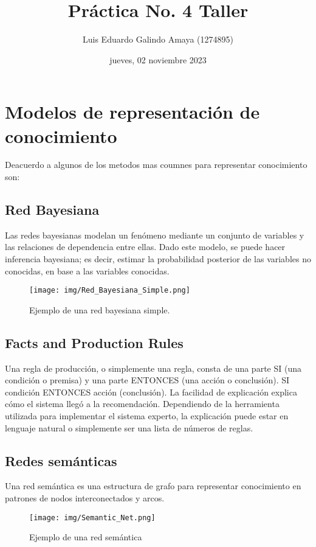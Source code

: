 \documentclass[11pt]{article}
\author{Luis Eduardo Galindo Amaya (1274895)}
\date{jueves, 02 noviembre 2023}
\title{Práctica No. 4 Taller}
\begin{document}

\tableofcontents
\pagebreak

\section{Modelos de representación de conocimiento}
\label{sec:org8bbcff0}
Deacuerdo a \autocite{prasad2012hybrid} algunos de los metodos
mas coumnes para representar conocimiento son:

\subsection{Red Bayesiana}
\label{sec:orgf6e561a}
\autocite{Sucar} Las redes bayesianas modelan un fenómeno
mediante un conjunto de variables y las relaciones de dependencia
entre ellas. Dado este modelo, se puede hacer inferencia bayesiana; es
decir, estimar la probabilidad posterior de las variables no
conocidas, en base a las variables conocidas.

\begin{figure}[htbp]
\centering
\texttt{[image: img/Red\_Bayesiana\_Simple.png]}
\caption{Ejemplo de una red bayesiana simple.}
\end{figure}

\subsection{Facts and Production Rules}
\label{sec:org0a8a0fb}
\autocite{expert_systems} Una regla de producción, o simplemente
una regla, consta de una parte SI (una condición o premisa) y una
parte ENTONCES (una acción o conclusión). SI condición ENTONCES acción 
(conclusión). La facilidad de explicación explica cómo el sistema
llegó a la recomendación. Dependiendo de la herramienta utilizada para 
implementar el sistema experto, la explicación puede estar en lenguaje
natural o simplemente ser una lista de números de reglas.

\subsection{Redes semánticas}
\label{sec:org6a4a179}
\autocite{Sowa_1993} Una red semántica es una estructura de grafo
para representar conocimiento en patrones de nodos interconectados y
arcos. 

\begin{figure}[htbp]
\centering
\texttt{[image: img/Semantic\_Net.png]}
\caption{Ejemplo de una red semántica}
\end{figure}
\end{document}

